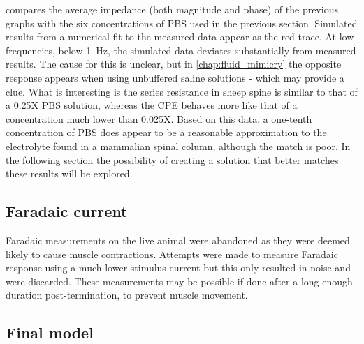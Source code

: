      compares the average impedance (both magnitude and phase) of the previous graphs with the six concentrations of PBS used in the previous section.
    Simulated results from a numerical fit to the measured data appear as the red trace.
    At low frequencies, below \SI{1}{\hertz}, the simulated data deviates substantially from measured results.
    The cause for this is unclear, but in \cref{chap:fluid_mimicry} the opposite response appears when using unbuffered saline solutions - which may provide a clue.
    What is interesting is the series resistance in sheep spine is similar to that of a 0.25X PBS solution, whereas the CPE behaves more like that of a concentration much lower than 0.025X.
    Based on this data, a one-tenth concentration of PBS does appear to be a reasonable approximation to the electrolyte found in a mammalian spinal column, although the match is poor.
    In the following section the possibility of creating a solution that better matches these results will be explored.


  \subsection{Faradaic current}

    Faradaic measurements on the live animal were abandoned as they were deemed likely to cause muscle contractions.
    Attempts were made to measure Faradaic response using a much lower stimulus current but this only resulted in noise and were discarded.
    These measurements may be possible if done after a long enough duration post-termination, to prevent muscle movement.

  \subsection{Final model}

